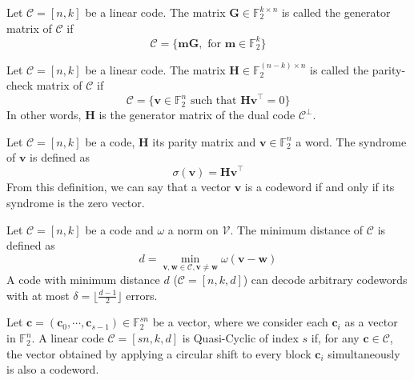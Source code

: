 \begin{definition}
    Let $\mathcal{C} = [n,k]$ be a linear code. The matrix $\mathbf{G} \in \mathds{F}_2^{k\times n}$ is called the generator 
    matrix of $\mathcal{C}$ if
    \begin{equation*}
        \mathcal{C} = \{\mathbf{mG}, \text{ for } \mathbf{m}\in \mathds{F}_2^k\}
    \end{equation*}
\end{definition}

\begin{definition}
    Let $\mathcal{C} = [n,k]$ be a linear code. The matrix $\mathbf{H} \in \mathds{F}_2^{(n-k)\times n}$ is called the 
    parity-check matrix of $\mathcal{C}$ if
    \begin{equation*}
        \mathcal{C} = \{\mathbf{v} \in \mathds{F}_2^n \text{ such that } \mathbf{Hv}^\top = 0\}
    \end{equation*}
    In other words, $\mathbf{H}$ is the generator matrix of the dual code $\mathcal{C}^\perp$.
\end{definition}


\begin{definition}[Syndrome]
    Let $\mathcal{C} = [n,k]$ be a code, $\mathbf{H}$ its parity matrix and $\mathbf{v} \in \mathds{F}_2^n$ a word. 
    The syndrome of $\mathbf{v}$ is defined as
    \begin{equation*}
        \sigma(\mathbf{v}) = \mathbf{Hv}^\top
    \end{equation*}
    From this definition, we can say that a vector $\mathbf{v}$ is a codeword if and only if its syndrome is the zero vector.
\end{definition}

\begin{definition}
    Let $\mathcal{C} = [n,k]$ be a code and $\omega$ a norm on $\mathcal{V}$. The minimum distance of $\mathcal{C}$ is defined as
    \begin{equation*}
        d = \min_{\mathbf{v}, \mathbf{w} \in \mathcal{C}, \mathbf{v}\neq \mathbf{w}} \omega(\mathbf{v} - \mathbf{w})
    \end{equation*}
    A code with minimum distance $d$ ($\mathcal{C} = [n,k,d]$) can decode arbitrary codewords with at most
    $\delta = \lfloor \frac{d-1}{2}\rfloor$ errors.
\end{definition}

\begin{definition}
    Let $\mathbf{c} = (\mathbf{c}_0, \cdots, \mathbf{c}_{s-1}) \in \mathds{F}_2^{sn}$ be a vector, where we consider 
    each $\mathbf{c}_i$ as a vector in $\mathds{F}_2^n$.
    A linear code $\mathcal{C} = [sn,k,d]$ is Quasi-Cyclic of index $s$ if, for any $\mathbf{c} \in \mathcal{C}$, 
    the vector obtained by applying a circular shift to every block $\mathbf{c}_i$ simultaneously is also a codeword.
\end{definition}


